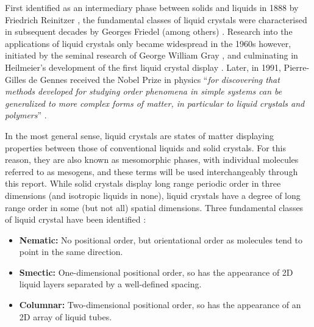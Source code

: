 \documentclass[11pt, a4paper]{article} %
\begin{document}
First identified as an intermediary phase between solids and liquids in 1888 by Friedrich Reinitzer \cite{Reinitzer1888}, the fundamental classes of liquid crystals were characterised in subsequent decades by Georges Friedel (among others) \cite{Friedel1922}. Research into the applications of liquid crystals only became widespread in the 1960s however, initiated by the seminal research of George William Gray \cite{Gray1962}, and culminating in Heilmeier's development of the first liquid crystal display \cite{Heilmeier1969, Heilmeier1968}. Later, in 1991, Pierre-Gilles de Gennes  received the Nobel Prize in physics ``\textit{for discovering that methods developed for studying order phenomena in simple systems can be generalized to more complex forms of matter, in particular to liquid crystals and polymers}'' \cite{DeGennes1992}.

In the most general sense, liquid crystals are states of matter displaying properties between those of conventional liquids and solid crystals. For this reason, they are also known as mesomorphic phases, with individual molecules referred to as mesogens, and these terms will be used interchangeably through this report. While solid crystals display long range periodic order in three dimensions (and isotropic liquids in none), liquid crystals have a degree of long range order in some (but not all) spatial dimensions. Three fundamental classes of liquid crystal have been identified \cite{DeGennes1993}:

\begin{itemize}
	\item \textbf{Nematic:} No positional order, but orientational order as molecules tend to point in the same direction.
	\item \textbf{Smectic:} One-dimensional positional order, so has the appearance of 2D liquid layers separated by a well-defined spacing.
	\item \textbf{Columnar:} Two-dimensional positional order, so has the appearance of an 2D array of liquid tubes.
\end{itemize}

\end{document}
